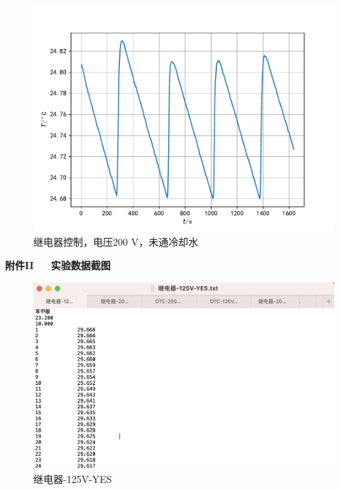 \documentclass[12pt]{ctexart}
\numberwithin{equation}{section}
\begin{document}
\begin{figure}[!h]
    \centering
    \includegraphics[scale=0.68]{Figure_8.pdf}
    \caption{继电器控制，电压200 V，未通冷却水}
\end{figure}

\pagebreak


\begin{center}
    \Large\bfseries{附件II~~~实验数据截图}
\end{center}

\begin{figure}[ht]
    \centering
    \includegraphics[width=1\textwidth]{1.png}
    \caption{继电器-125V-YES}
\end{figure}
\end{document}
